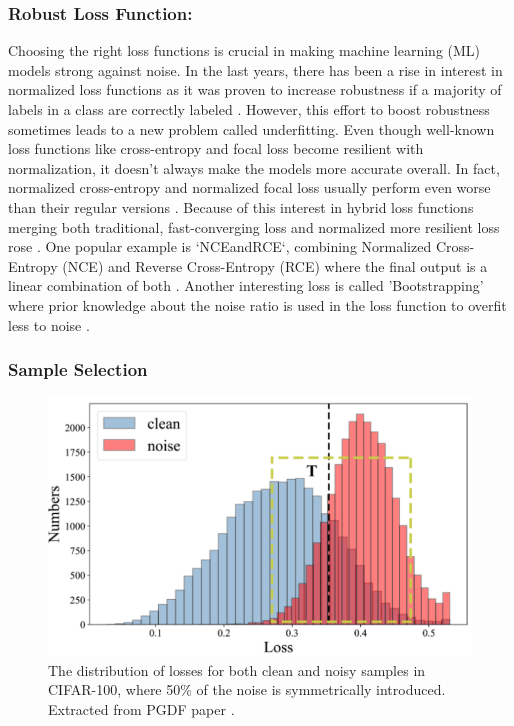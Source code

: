 \documentclass[11pt,twocolumn,letterpaper]{article}
\begin{document}
\subsubsection{Robust Loss Function:}
Choosing the right loss functions is crucial in making machine learning (ML) models strong against noise. In the last years, there has been a rise in interest in normalized loss functions as it was proven to increase robustness if a majority of labels in a class are correctly labeled \cite{englessonGeneralizedJensenShannonDivergence2021} \cite{maNormalizedLossFunctions2020}. However, this effort to boost robustness sometimes leads to a new problem called underfitting. Even though well-known loss functions like cross-entropy and focal loss become resilient with normalization, it doesn't always make the models more accurate overall. In fact, normalized cross-entropy and normalized focal loss usually perform even worse than their regular versions \cite{maNormalizedLossFunctions2020}. Because of this interest in hybrid loss functions merging both traditional, fast-converging loss and normalized more resilient loss rose \cite{wangSymmetricCrossEntropy2019} \cite{maNormalizedLossFunctions2020}. One popular example is `NCEandRCE`, combining Normalized Cross-Entropy (NCE) and Reverse Cross-Entropy (RCE) where the final output is a linear combination of both \cite{maNormalizedLossFunctions2020}. Another interesting loss is called 'Bootstrapping' where prior knowledge about the noise ratio is used in the loss function to overfit less to noise \cite{GJSLossesPy}.


\subsubsection{Sample Selection}
\begin{figure}[!h]
    \centering
    \includegraphics[width=1\linewidth]{distribution1.png}
    \caption{The distribution of losses for both clean and noisy samples in CIFAR-100, where 50\% of the noise is symmetrically introduced. Extracted from PGDF paper \cite{chenSamplePriorGuided2022}.}
    \label{fig:distribution1l}
\end{figure}
\end{document}
